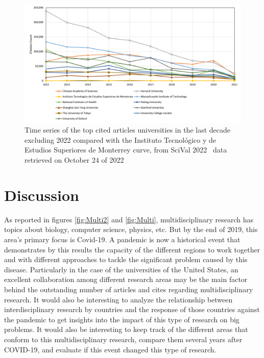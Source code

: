 \documentclass[conference]{IEEEtran}
\begin{document}
\begin{figure}[H]
    \centering
    \includegraphics[width = 8 cm]{Universities2.png}
    \caption{Time series of the top cited articles universities in the last decade excluding 2022 compared with the Instituto Tecnológico y de Estudios Superiores de Monterrey curve, from SciVal 2022~\cite{Scival2022} data retrieved on October 24 of 2022}
    \label{fig:Universities2}
\end{figure}

\section{Discussion}
\label{sec:Discussion}

As reported in figures \ref{fig:Multi2} and \ref{fig:Multi}, multidisciplinary research has topics about biology, computer science, physics, etc. But by the end of 2019, this area's primary focus is Covid-19. A pandemic is now a historical event that demonstrates by this results the capacity of the different regions to work together and with different approaches to tackle the significant problem caused by this disease. 
Particularly in the case of the universities of the United States, an excellent collaboration among different research areas may be the main factor behind the outstanding number of articles and cites regarding multidisciplinary research. It would also be interesting to analyze the relationship between interdisciplinary research by countries and the response of those countries against the pandemic to get insights into the impact of this type of research on big problems. It would also be interesting to keep track of the different areas that conform to this multidisciplinary research, compare them several years after COVID-19, and evaluate if this event changed this type of research.
\end{document}
